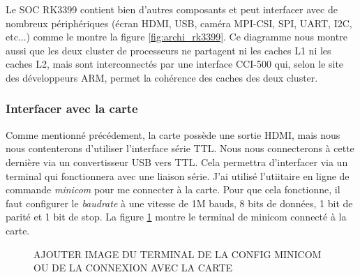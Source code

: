 Le SOC RK3399 contient bien d'autres composants et peut interfacer avec de nombreux périphériques (écran HDMI, USB, caméra MPI-CSI, SPI, UART, I2C, etc...) comme le montre la figure \ref{fig:archi_rk3399}. Ce diagramme nous montre aussi que les deux \gls{cluster} de processeurs ne partagent ni les caches L1 ni les caches L2, mais sont interconnectés par une interface CCI-500 qui, selon le site des développeurs ARM, permet la cohérence des caches des deux cluster.


\subsubsection{Interfacer avec la carte}

Comme mentionné précédement, la carte possède une sortie HDMI, mais nous nous contenterons d'utiliser l'interface série TTL. Nous nous connecterons à cette dernière via un convertisseur USB vers TTL. Cela permettra d'interfacer via un terminal qui fonctionnera avec une liaison série. J'ai utilisé l'utiitaire en ligne de commande \textit{minicom} pour me connecter à la carte. Pour que cela fonctionne, il faut configurer le \textit{baudrate} à une vitesse de 1M bauds, 8 bits de données, 1 bit de parité et 1 bit de stop.
La figure \ref{fig:terminal} montre le terminal de minicom connecté à la carte.


\begin{figure}[H]
    \centering
    \color{red} AJOUTER IMAGE DU TERMINAL DE LA CONFIG MINICOM OU DE LA CONNEXION AVEC LA CARTE
    \label{fig:terminal}
\end{figure}

